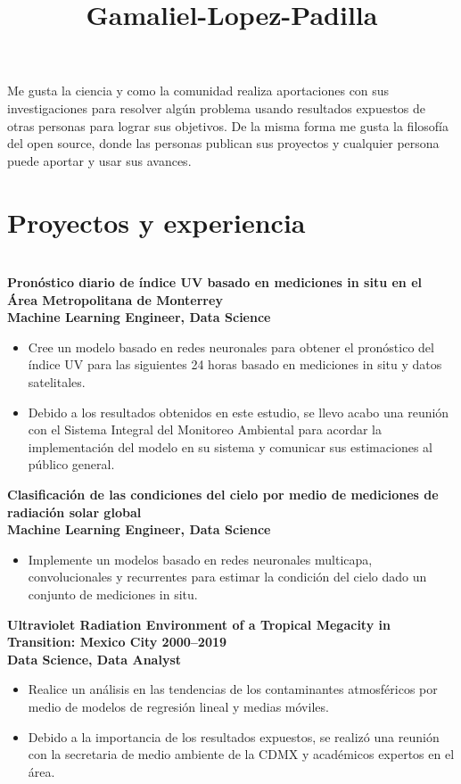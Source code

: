 \documentclass[a3paper]{adcv_color}
\title{Gamaliel-Lopez-Padilla}
\newcommand{\proyect}[2]{
\textbf{#2}\\
{\color{linktext}	\textbf {#1}}
\vspace{-1cm}\\
}
\begin{document}
\changefontsizes{15pt}
\begin{flushleft}
	Me gusta la ciencia y como la comunidad realiza  aportaciones con sus investigaciones para resolver algún problema usando resultados expuestos de otras personas para lograr sus objetivos. De la misma forma me gusta la filosofía del open source, donde las personas publican sus proyectos y cualquier persona puede aportar y usar sus avances.\\
\end{flushleft}

\section{Proyectos y experiencia}\\

\proyect{Machine Learning Engineer, Data Science}{Pronóstico diario de índice UV basado en mediciones in situ en el Área Metropolitana de Monterrey}
\begin{itemize}
	\setlength\itemsep{0em}
	\item Cree un modelo basado en redes neuronales para obtener el pronóstico del índice UV para las siguientes 24 horas basado en mediciones in situ y datos satelitales.
	\item Debido a los resultados obtenidos en este estudio, se llevo acabo una reunión con el Sistema Integral del Monitoreo Ambiental para acordar la implementación del modelo en su sistema y comunicar sus estimaciones al público general.
\end{itemize}
\proyect{Machine Learning Engineer, Data Science}{Clasificación de las condiciones del cielo por medio de mediciones de radiación solar global}
\begin{itemize}
	\setlength\itemsep{0em}
	\item Implemente un modelos basado en redes neuronales multicapa, convolucionales y recurrentes para estimar la condición del cielo dado un conjunto de mediciones in situ.
\end{itemize}
\proyect{Data Science, Data Analyst}{Ultraviolet Radiation Environment of a Tropical Megacity in Transition: Mexico City 2000–2019}
\begin{itemize}
	\setlength\itemsep{0em}
	\item Realice un análisis en las tendencias de los contaminantes atmosféricos por medio de modelos de regresión lineal y medias móviles.
	\item Debido a la importancia de los resultados expuestos, se realizó una reunión con la secretaria de medio ambiente de la CDMX y académicos expertos en el área.
\end{itemize}
\end{document}
